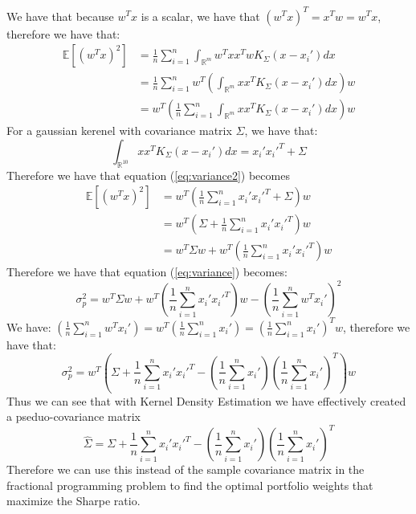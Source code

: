 \documentclass[10pt]{article}
\begin{document}
We have that because $w^Tx$ is a scalar, we have that $(w^Tx)^T=x^Tw=w^Tx$, therefore we have that:
\begin{align}
    \mathbb{E}[(w^T x)^2] &= \frac{1}{n} \sum_{i=1}^n\int_{\mathbb{R}^{m}} w^Txx^Tw K_{\Sigma}(x-x_i') dx \\
    &= \frac{1}{n} \sum_{i=1}^nw^T\left(\int_{\mathbb{R}^{m}} xx^T K_{\Sigma}(x-x_i') dx\right)w\\
    &= w^T\left(\frac{1}{n}\sum_{i=1}^n\int_{\mathbb{R}^{m}} xx^T K_{\Sigma}(x-x_i') dx\right)w
    \label{eq:variance2}
\end{align}
For a gaussian kerenel with covariance matrix $\Sigma$, we have that:
\begin{equation}
    \int_{\mathbb{R}^{10}} xx^T K_{\Sigma}(x-x_i') dx = x_i'x_i'^T + \Sigma
\end{equation}
Therefore we have that 
equation (\ref{eq:variance2}) becomes
\begin{align}
    \mathbb{E}[(w^T x)^2]
    &= w^T\left(\frac{1}{n}\sum_{i=1}^nx_i'x_i'^T + \Sigma\right)w\\
    &=  w^T\left(\Sigma+\frac{1}{n}\sum_{i=1}^nx_i'x_i'^T\right)w\\
    &=  w^T\Sigma w + w^T\left(\frac{1}{n}\sum_{i=1}^nx_i'x_i'^T\right)w
\end{align}
Therefore we have that equation (\ref{eq:variance}) becomes:
\begin{equation}
    \sigma_p^2 =w^T\Sigma w + w^T\left(\frac{1}{n}\sum_{i=1}^nx_i'x_i'^T\right)w-\left(\frac{1}{n} \sum_{i=1}^nw^T x_i'\right)^2
\end{equation}
We have: $\left(\frac{1}{n} \sum_{i=1}^nw^T x_i'\right)=w^T\left(\frac{1}{n} \sum_{i=1}^nx_i'\right)=\left(\frac{1}{n} \sum_{i=1}^nx_i'\right)^Tw$, therefore we have that:
\begin{equation}
    \sigma_p^2 = w^T\left(\Sigma +  \frac{1}{n}\sum_{i=1}^nx_i'x_i'^T - \left(\frac{1}{n} \sum_{i=1}^nx_i'\right)\left(\frac{1}{n} \sum_{i=1}^nx_i'\right)^T\right)w
\end{equation}
Thus we can see that with Kernel Density Estimation we have effectively created a pseduo-covariance matrix
\begin{equation}
    \hat{\Sigma} = \Sigma +  \frac{1}{n}\sum_{i=1}^nx_i'x_i'^T -\left(\frac{1}{n} \sum_{i=1}^nx_i'\right)\left(\frac{1}{n} \sum_{i=1}^nx_i'\right)^T
\end{equation}
Therefore we can use this instead of the sample covariance matrix in the fractional programming problem to find the optimal
portfolio weights that maximize the Sharpe ratio.\\\\
\end{document}
